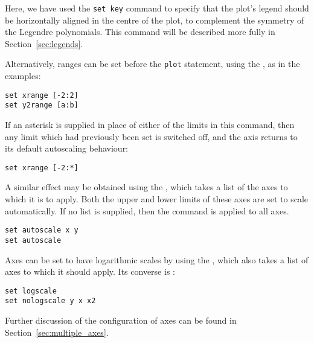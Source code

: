 \noindent Here, we have used the {\tt set key} command to specify that the
plot's legend should be horizontally aligned in the centre of the plot, to
complement the symmetry of the Legendre polynomials. This command will be
described more fully in Section~\ref{sec:legends}.

Alternatively, ranges can be set before the {\tt plot} statement, using the
, as in the examples:

\begin{verbatim}
set xrange [-2:2]
set y2range [a:b]
\end{verbatim}

If an asterisk is supplied in place of either of the limits in this command, then
any limit which had previously been set is switched off, and the axis returns to
its default autoscaling behaviour:

\begin{verbatim}
set xrange [-2:*]
\end{verbatim}

\noindent A similar effect may be obtained using the ,
which takes a list of the axes to which it is to apply. Both the upper and
lower limits of these axes are set to scale automatically. If no list is
supplied, then the command is applied to all axes.

\begin{verbatim}
set autoscale x y
set autoscale
\end{verbatim}

Axes can be set to have logarithmic scales by using the ,
which also takes a list of axes to which it should apply. Its converse is
:

\begin{verbatim}
set logscale
set nologscale y x x2
\end{verbatim}

Further discussion of the configuration of axes can be found in
Section~\ref{sec:multiple_axes}.

